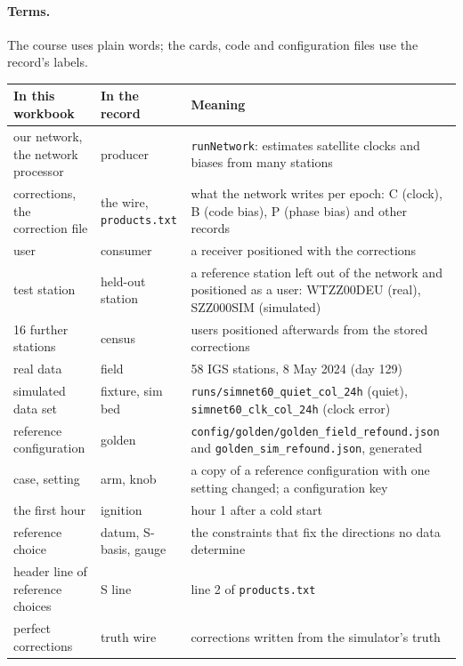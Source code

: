 \documentclass[11pt,letterpaper]{article}
\begin{document}
\paragraph{Terms.} The course uses plain words; the cards, code and
configuration files use the record's labels.
\begin{center}\footnotesize
\begin{tabular}{@{}p{3.6cm}p{3.4cm}p{7.2cm}@{}}
\toprule
In this workbook & In the record & Meaning \\
\midrule
our network, the network processor & producer & \texttt{runNetwork}: estimates satellite clocks and biases from many stations \\
corrections, the correction file & the wire, \texttt{products.txt} & what the network writes per epoch: C (clock), B (code bias), P (phase bias) and other records \\
user & consumer & a receiver positioned with the corrections \\
test station & held-out station & a reference station left out of the network and positioned as a user: WTZZ00DEU (real), SZZ000SIM (simulated) \\
16 further stations & census & users positioned afterwards from the stored corrections \\
real data & field & 58 IGS stations, 8 May 2024 (day 129) \\
simulated data set & fixture, sim bed & \texttt{runs/simnet60\_quiet\_col\_24h} (quiet), \texttt{simnet60\_clk\_col\_24h} (clock error) \\
reference configuration & golden & \texttt{config/golden/golden\_field\_refound.json} and \texttt{golden\_sim\_refound.json}, generated \\
case, setting & arm, knob & a copy of a reference configuration with one setting changed; a configuration key \\
the first hour & ignition & hour 1 after a cold start \\
reference choice & datum, S-basis, gauge & the constraints that fix the directions no data determine \\
header line of reference choices & S line & line 2 of \texttt{products.txt} \\
perfect corrections & truth wire & corrections written from the simulator's truth \\
\bottomrule
\end{tabular}
\end{center}



\end{document}
